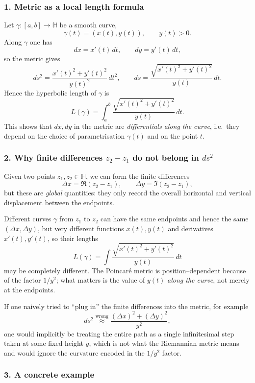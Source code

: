 \documentclass[12pt,a4paper]{article}
\theoremstyle{plain}
\theoremstyle{definition}      %
\begin{document}
\subsubsection*{1. Metric as a local length formula}

Let $\gamma:[a,b]\to\mathbb H$ be a smooth curve,
\[
\gamma(t) = (x(t),y(t)),\qquad y(t)>0.
\]
Along $\gamma$ one has
\[
dx = x'(t)\,dt,
\qquad
dy = y'(t)\,dt,
\]
so the metric gives
\[
ds^{2}
= \frac{x'(t)^{2} + y'(t)^{2}}{y(t)^{2}}\,dt^{2},
\qquad
ds = \frac{\sqrt{x'(t)^{2} + y'(t)^{2}}}{y(t)}\,dt.
\]
Hence the hyperbolic length of $\gamma$ is
\[
L(\gamma)
= \int_{a}^{b} \frac{\sqrt{x'(t)^{2} + y'(t)^{2}}}{y(t)}\,dt.
\]
This shows that $dx,dy$ in the metric are \emph{differentials along the
	curve}, i.e.\ they depend on the choice of parametrisation
$\gamma(t)$ and on the point $t$.

\subsubsection*{2. Why finite differences $z_{2}-z_{1}$ do not belong in $ds^{2}$}

Given two points $z_{1},z_{2}\in\mathbb H$, we can form the finite
differences
\[
\Delta x = \Re(z_{2}-z_{1}),
\qquad
\Delta y = \Im(z_{2}-z_{1}),
\]
but these are \emph{global} quantities: they only record the overall
horizontal and vertical displacement between the endpoints.

Different curves $\gamma$ from $z_{1}$ to $z_{2}$ can have the same
endpoints and hence the same $(\Delta x,\Delta y)$, but very different
functions $x(t),y(t)$ and derivatives $x'(t),y'(t)$, so their lengths
\[
L(\gamma) = \int \frac{\sqrt{x'(t)^{2}+y'(t)^{2}}}{y(t)}\,dt
\]
may be completely different.  The Poincaré metric is position--dependent
because of the factor $1/y^{2}$; what matters is the value of $y(t)$
\emph{along the curve}, not merely at the endpoints.

If one naively tried to ``plug in'' the finite differences into the metric,
for example
\[
ds^{2} \stackrel{\text{wrong}}{\approx}
\frac{(\Delta x)^{2} + (\Delta y)^{2}}{y^{2}},
\]
one would implicitly be treating the entire path as a single infinitesimal
step taken at some fixed height $y$, which is not what the Riemannian
metric means and would ignore the curvature encoded in the $1/y^{2}$ factor.

\subsubsection*{3. A concrete example}
\end{document}
